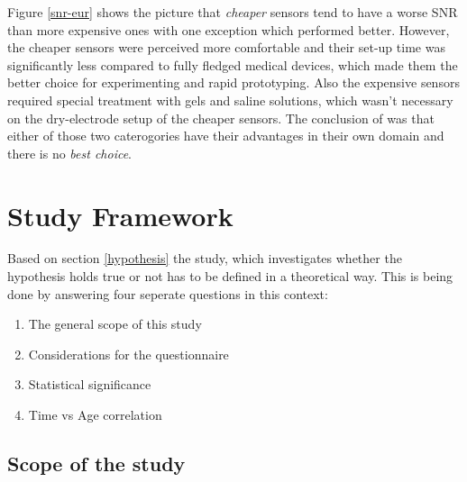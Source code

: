             Figure \ref{snr-eur} shows the picture that \textit{cheaper} sensors tend to have a worse SNR than more expensive ones with one exception which performed better. However, the cheaper sensors were perceived more comfortable and their set-up time was significantly less compared to fully fledged medical devices, which made them the better choice for experimenting and rapid prototyping. Also the expensive sensors required special treatment with gels and saline solutions, which wasn't necessary on the dry-electrode setup of the cheaper sensors. The conclusion of \cite{Zerafa.2018} was that either of those two caterogories have their advantages in their own domain and there is no \textit{best choice}.

    \chapter{Study Framework}\label{survey-framework}

        Based on section \ref*{hypothesis} the study, which investigates whether the hypothesis holds true or not has to be defined in a theoretical way. This is being done by answering four seperate questions in this context:

        \begin{enumerate}
            \item The general scope of this study
            \item Considerations for the questionnaire
            \item Statistical significance
            \item Time vs Age correlation
        \end{enumerate}

        \section{Scope of the study}

